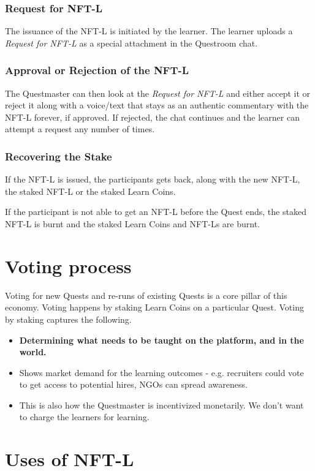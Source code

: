 \documentclass{article}
\begin{document}
        \subsubsection{Request for NFT-L}
          The issuance of the NFT-L is initiated by the learner. The learner uploads a \textit{Request for NFT-L} as a special attachment in the Questroom chat.
        \subsubsection{Approval or Rejection of the NFT-L}
          The Questmaster can then look at the \textit{Request for NFT-L} and either accept it or reject it along with a voice/text that stays as an authentic commentary with the NFT-L forever, if approved. 
          If rejected, the chat continues and the learner can attempt a request any number of times.
        \subsubsection{Recovering the Stake}
          If the NFT-L is issued, the participants gets back, along with the new NFT-L, the staked NFT-L or the staked Learn Coins.
          \par
          If the participant is not able to get an NFT-L before the Quest ends, the staked NFT-L is burnt and the staked Learn Coins and NFT-Ls are burnt.
  \section{Voting process}
    Voting for new Quests and re-runs of existing Quests is a core pillar of this economy. 
    Voting happens by staking Learn Coins on a particular Quest.
    Voting by staking captures the following.
    \begin{itemize}
      \item \textbf{Determining what needs to be taught on the platform, and in the world.}
      \item Shows market demand for the learning outcomes - e.g. recruiters could vote to get access to potential hires,  NGOs can spread awareness.
      \item This is also how the Questmaster is incentivized monetarily. We don't want to charge the learners for learning.
    \end{itemize}
  \section{Uses of NFT-L}
\end{document}
